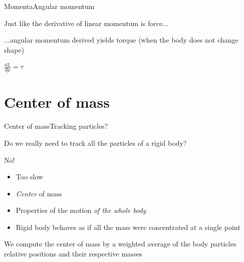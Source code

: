 \documentclass{beamer}
\begin{document}

\begin{slide}{Momenta}{Angular momentum}{
\item Just like the derivative of linear momentum is force...
\item ...angular momentum derived yields torque (when the body does not change shape)
\item $\frac{dL}{dp} = \tau$
}\end{slide}

\section{Center of mass}
\begin{slide}{Center of mass}{Tracking particles?}{
\item Do we really need to track all the particles of a rigid body?
\item No!
\begin{itemize}
\item Too slow
\item \textit{Center} of mass
\item Properties of the motion \textit{of the whole body}
\item Rigid body behaves as if all the mass were concentrated at a single point
\end{itemize}
\item We compute the center of mass by a weighted average of the body particles relative positions and their respective masses
}\end{slide}
\end{document}
